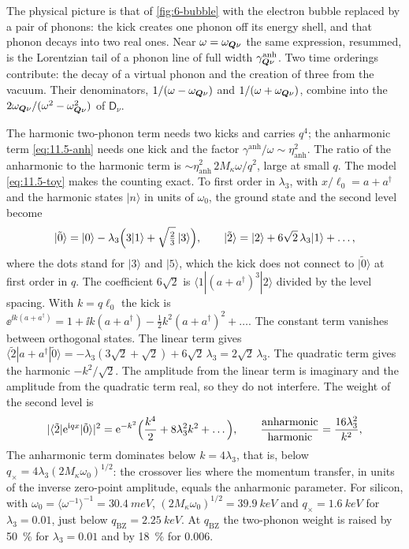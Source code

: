 \noindent The physical picture is that of \cref{fig:6-bubble} with the electron bubble replaced by a pair of phonons: the kick creates one phonon off its energy shell, and that phonon decays into two real ones. Near $\omega = \omega_{\bm{Q}\nu}$ the same expression, resummed, is the Lorentzian tail of a phonon line of full width $\gamma^{\mathrm{anh}}_{\bm{Q}\nu}$. Two time orderings contribute: the decay of a virtual phonon and the creation of three from the vacuum. Their denominators, $1/(\omega - \omega_{\bm{Q}\nu})$ and $1/(\omega + \omega_{\bm{Q}\nu})$, combine into the $2\omega_{\bm{Q}\nu}/(\omega^2 - \omega_{\bm{Q}\nu}^2)$ of $\mathsf{D}_\nu$.

The harmonic two-phonon term needs two kicks and carries $q^4$; the anharmonic term \cref{eq:11.5-anh} needs one kick and the factor $\gamma^{\mathrm{anh}}/\omega \sim \eta_{\mathrm{anh}}^2$. The ratio of the anharmonic to the harmonic term is $\sim\eta_{\mathrm{anh}}^2\,2M_\kappa\omega/q^2$, large at small $q$. The model \cref{eq:11.5-toy} makes the counting exact. To first order in $\lambda_3$, with $x/\ell_0 = a + a^\dagger$ and the harmonic states $|n\rangle$ in units of $\omega_0$, the ground state and the second level become
\begin{equation*}
  |\tilde0\rangle = |0\rangle - \lambda_3\Bigl(3|1\rangle + \sqrt{\tfrac23}\,|3\rangle\Bigr) , \qquad
  |\tilde2\rangle = |2\rangle + 6\sqrt2\,\lambda_3|1\rangle + \dots ,
\end{equation*}
where the dots stand for $|3\rangle$ and $|5\rangle$, which the kick does not connect to $|\tilde0\rangle$ at first order in $q$. The coefficient $6\sqrt2$ is $\langle1|(a + a^\dagger)^3|2\rangle$ divided by the level spacing. With $k = q\ell_0$ the kick is $\ee^{\ii k(a + a^\dagger)} = 1 + \ii k(a + a^\dagger) - \frac12k^2(a + a^\dagger)^2 + \dots$. The constant term vanishes between orthogonal states. The linear term gives $\langle\tilde2|a + a^\dagger|\tilde0\rangle = -\lambda_3(3\sqrt2 + \sqrt2) + 6\sqrt2\,\lambda_3 = 2\sqrt2\,\lambda_3$. The quadratic term gives the harmonic $-k^2/\sqrt2$. The amplitude from the linear term is imaginary and the amplitude from the quadratic term real, so they do not interfere. The weight of the second level is
\begin{equation}
  |\langle\tilde2|\mathrm{e}^{\mathrm{i} qx}|\tilde0\rangle|^2 = \mathrm{e}^{-k^2}\Bigl(\frac{k^4}{2} + 8\lambda_3^2k^2 + \dots\Bigr) , \qquad
  \frac{\text{anharmonic}}{\text{harmonic}} = \frac{16\lambda_3^2}{k^2} ,
  \label{eq:11.5-two}
\end{equation}
The anharmonic term dominates below $k = 4\lambda_3$, that is, below $q_\times = 4\lambda_3(2M_\kappa\omega_0)^{1/2}$: the crossover lies where the momentum transfer, in units of the inverse zero-point amplitude, equals the anharmonic parameter. For silicon, with $\omega_0 = \langle\omega^{-1}\rangle^{-1} = \SI{30.4}{meV}$, $(2M_\kappa\omega_0)^{1/2} = \SI{39.9}{keV}$ and $q_\times = \SI{1.6}{keV}$ for $\lambda_3 = 0.01$, just below $q_{\mathrm{BZ}} = \SI{2.25}{keV}$. At $q_{\mathrm{BZ}}$ the two-phonon weight is raised by \SI{50}{\percent} for $\lambda_3 = 0.01$ and by \SI{18}{\percent} for $0.006$.

